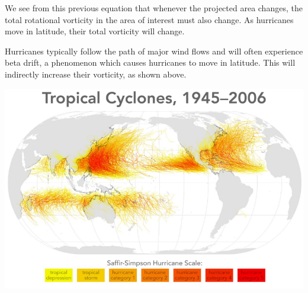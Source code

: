 \begin{minipage}{0.49\textwidth}
    We see from this previous equation that whenever the projected area changes, the total rotational vorticity in the area of interest must also change. As hurricanes move in latitude, their total vorticity will change.
    \vspace{1cm}

    Hurricanes typically follow the path of major wind flows and will often experience beta drift, a phenomenon which causes hurricanes to move in latitude. This will indirectly increase their vorticity, as shown above.
    \vspace{2cm}
\end{minipage}\hspace{0.05\textwidth}
\begin{minipage}{0.49\textwidth}
    \begin{center}
        \includegraphics[width=\linewidth]{assets/list.png}
        \label{fig:cyclones}
    \end{center}
\end{minipage}


